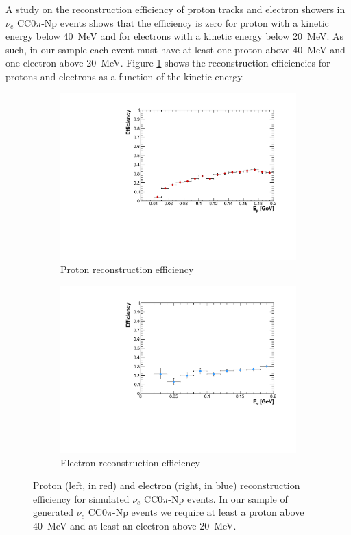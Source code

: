 A study on the reconstruction efficiency of proton tracks and electron showers in $\nu_{e}$ CC$0\pi$-Np events shows that the efficiency is zero for proton with a kinetic energy below 40~MeV and for electrons with a kinetic energy below 20~MeV. As such, in our sample each event must have at least one proton above 40~MeV and one electron above 20~MeV. Figure \ref{fig:kin_eff} shows the reconstruction efficiencies for protons and electrons as a function of the kinetic energy.

\begin{figure}[htbp]
  \begin{subfigure}{0.48\textwidth}
    \includegraphics[width=\linewidth]{figures/proton_eff.pdf}
    \caption{Proton reconstruction efficiency} 
  \end{subfigure}
    \begin{subfigure}{0.48\textwidth}
    \includegraphics[width=\linewidth]{figures/electron_eff.pdf}
    \caption{Electron reconstruction efficiency} 
  \end{subfigure}
  \caption{Proton (left, in red) and electron (right, in blue) reconstruction efficiency for simulated $\nu_{e}$ CC$0\pi$-Np events. In our sample of generated $\nu_{e}$ CC$0\pi$-Np events we require at least a proton above 40~MeV and at least an electron above 20~MeV.}
  \label{fig:kin_eff}
\end{figure}


